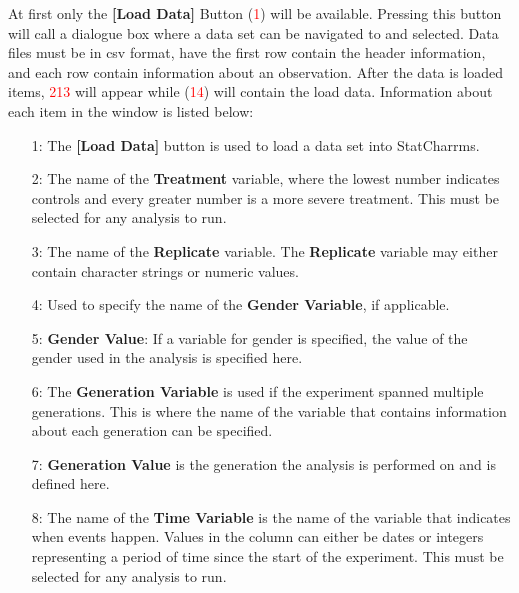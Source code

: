 \documentclass[a4paper]{article}
\begin{document}
At first only the  \textbf{[Load Data]} Button (\textcolor{red}{1}) will be available.  Pressing this button will 
call a dialogue box where a data set can be navigated to and selected. Data files must be in csv format, have the first row contain 
the header information, and each row contain information about an observation.  After the data is loaded items,  
\textcolor{red}{2\textendash{}13} will appear while (\textcolor{red}{14}) will contain the load data. Information
about each item in the window is listed below:    
    
\begin{enumerate}

\item[\begingroup\color{red}1:\endgroup] The \textbf{[Load Data]} button is used to load a data set into StatCharrms. 

\item[\begingroup\color{red}2:\endgroup] The name of the \textbf{Treatment} variable, where the lowest number indicates controls and every greater number is a more severe treatment.  
	This must be selected for any analysis to run.
	
\item[\begingroup\color{red}3:\endgroup] The name of the \textbf{Replicate} variable.  The \textbf{Replicate} variable may 
	either contain character strings or numeric values. 

\item[\begingroup\color{red}4:\endgroup] Used to specify the name of the \textbf{Gender Variable}, if applicable.

\item[\begingroup\color{red}5:\endgroup] \textbf{Gender Value}: If a variable for gender is specified, the value of the gender used in the analysis is specified here. 

\item[\begingroup\color{red}6:\endgroup] The \textbf{Generation Variable} is used if the experiment spanned multiple generations. This is where the name of the variable that contains 
	information about each generation can be specified.

\item[\begingroup\color{red}7:\endgroup] \textbf{Generation Value} is the generation the analysis is performed on and is defined here.

\item[\begingroup\color{red}8:\endgroup] The name of the \textbf{Time Variable} is the name of the variable that indicates when events happen. 
	Values in the column can either be dates or integers representing a period of time since the start of the experiment.  
	This must be selected for any analysis to run.  


\end{enumerate}
\end{document}
